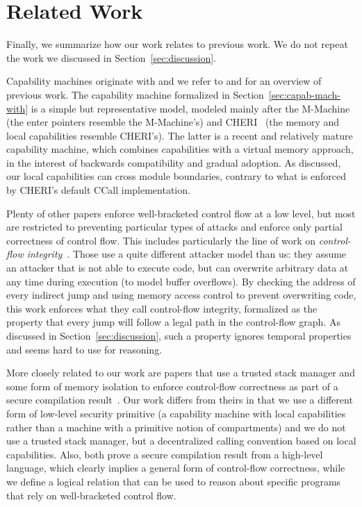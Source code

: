 \documentclass[format=acmsmall, review=false, screen=true]{acmart}
\renewcommand{\sectionname}{Section}
\newcommand\lau[1]{{\color{purple} \sf \footnotesize {LS: #1}}\\}
\renewcommand\lau[1]{}
\begin{document}
\section{Related Work}
\label{sec:related-work}

Finally, we summarize how our work relates to previous work. We do not
repeat the work we discussed in \sectionname~\ref{sec:discussion}.

Capability machines originate with \citet{Dennis:1966:PSM:365230.365252} and we refer to \citet{Levy1984capability} and \citet{Watson2015Cheri} for an overview
of previous work. The capability machine formalized in
\sectionname~\ref{sec:capab-mach-with} is a simple but representative
model, modeled mainly after the
M-Machine~\citep{Carter:1994:HSF:195473.195579} (the enter pointers
resemble the M-Machine's) and
CHERI~\citep{Watson2015Cheri,Woodruff:2014:CCM:2665671.2665740} (the
memory and local capabilities resemble CHERI's). The latter is a
recent and relatively mature capability machine, which combines
capabilities with a virtual memory approach, in the interest of
backwards compatibility and gradual adoption. As discussed, our local
capabilities can cross module boundaries, 
contrary to what is enforced by CHERI's default CCall implementation.

Plenty of other papers\lau{If there are plenty, then I guess we should cite more
  than one?} enforce well-bracketed control flow at a low level, but most are
restricted to preventing particular types of attacks and enforce only partial
correctness of control flow. This includes particularly the line of work on
\emph{control-flow integrity}~\citep{abadi_control-flow_2005}. Those use a quite
different attacker model than us: they assume an attacker that is not able to
execute code, but can overwrite arbitrary data at any time during execution (to
model buffer overflows). By checking the address of every indirect jump and
using memory access control to prevent overwriting code, this work enforces what
they call control-flow integrity, formalized as the property that every jump
will follow a legal path in the control-flow graph. As discussed in
\sectionname~\ref{sec:discussion}, such a property ignores temporal properties and
seems hard to use for reasoning.

More closely related to our work are papers that use a trusted stack manager and
some form of memory isolation to enforce control-flow correctness as part of a
secure compilation
result~\citep{patrignani_modular_2016-1,juglaret_beyond_2016-1}. Our work
differs from theirs in that we use a different form of low-level security
primitive (a capability machine with local capabilities rather than a machine
with a primitive notion of compartments) and we do not use a trusted stack
manager, but a decentralized calling convention based on local
capabilities. Also, both prove a secure compilation result from a high-level
language, which clearly implies a general form of control-flow correctness,
while we define a logical relation that can be used to reason about
specific programs that rely on well-bracketed control flow.
\end{document}
